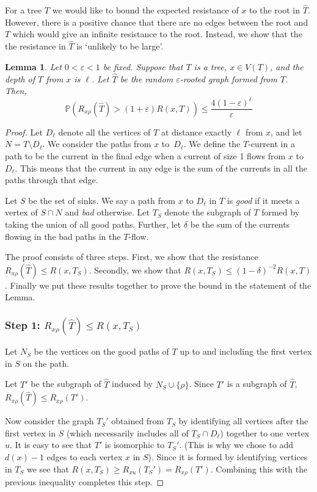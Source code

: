 \documentclass[11pt]{article}
\newtheorem{lemma}[theorem]{Lemma}
\theoremstyle{remark}
\def\eps{\varepsilon}
\newcommand\Prb{\mathbb{P}}
\begin{document}
For a tree $T$ we would like to bound the expected resistance of $x$
to the root in $\widehat T$. However, there is a positive chance that
there are no edges between the root and $T$ which would give an
infinite resistance to the root. Instead, we show that the the
resistance in $\widehat T$ is `unlikely to be large'.



\begin{lemma}\label{l:rooted}
  Let $0<\eps<1$ be fixed.  Suppose that $T$ is a tree, $x\in V(T)$,
  and the depth of $T$ from $x$ is $\ell$. Let $\widehat T$ be the
  random $\eps$-rooted graph formed from $T$. Then,
  \[
  \Prb\left(R_{x\rho}(\widehat T)>(1+\eps)R(x,T)\right)\le \frac{4(1-\eps)^\ell}{\eps}
  \]
\end{lemma}
\begin{proof}
  Let $D_\ell$ denote all the vertices of $T$ at distance exactly $\ell$ from $x$,
  and let $N=T\setminus D_\ell$.  We consider the paths from $x$
  to~$D_\ell$. We define the $T$-current in a path to be the current
  in the final edge when a current of size 1 flows from $x$
  to~$D_\ell$. This means that the current in any edge is the sum of
  the currents in all the paths through that edge.

  Let $S$ be the set of sinks.  We say a path from $x$ to $D_\ell$ in
  $T$ is \emph{good} if it meets a vertex of $S\cap N$ and \emph{bad}
  otherwise. Let $T_S$ denote the subgraph of $T$ formed by taking the
  union of all good paths. Further, let $\delta$ be the sum of the
  currents flowing in the bad paths in the $T$-flow.

  The proof consists of three steps. First, we show that the
  resistance $R_{x\rho}(\widehat T)\le R(x,T_{S})$. Secondly, we show that
  $R(x,T_{S})\le (1-\delta)^{-2}R(x,T)$. Finally we put these results
  together to prove the bound in the statement of the Lemma.

\subsubsection*{Step 1: $R_{x\rho}(\widehat T)\le R(x,T_{S})$}
Let $N_S$ be the vertices on the good paths of $T$ up to and
including the first vertex in $S$ on the path.

Let $T'$ be the subgraph of $\widehat T$ induced by
$N_S\cup\{\rho\}$. Since $T'$ is a subgraph of $\widehat T$,
$R_{x\rho}(\widehat T)\le R_{x\rho}(T')$.

Now consider the graph $T_S'$ obtained from $T_{S}$ by identifying all
vertices after the first vertex in $S$ (which necessarily includes all
of $T_S\cap D_\ell$) together to one vertex $u$. It is easy to see
that $T'$ is isomorphic to $T_S'$. (This is why we chose to add
$d(x)-1$ edges to each vertex $x$ in $S$).  Since it is formed by
identifying vertices in $T_{S}$ we see that
$ R(x,T_{S})\ge R_{xu}(T_S')= R_{x\rho}(T')$.  Combining this with the
previous inequality completes this step.


\end{proof}
\end{document}
